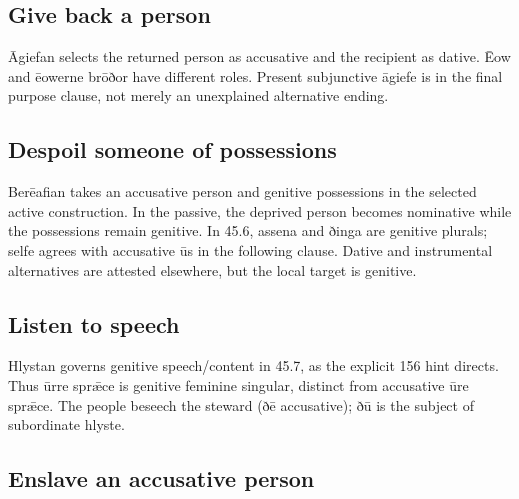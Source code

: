 \subsection*{Give back a person}

Āgiefan selects the returned person as accusative and the recipient as dative. Ēow and ēowerne brōðor have different roles. Present subjunctive āgiefe is in the final purpose clause, not merely an unexplained alternative ending.

\subsection*{Despoil someone of possessions}

Berēafian takes an accusative person and genitive possessions in the selected active construction. In the passive, the deprived person becomes nominative while the possessions remain genitive. In 45.6, assena and ðinga are genitive plurals; selfe agrees with accusative ūs in the following clause. Dative and instrumental alternatives are attested elsewhere, but the local target is genitive.

\subsection*{Listen to speech}

Hlystan governs genitive speech/\allowbreak{}content in 45.7, as the explicit 156 hint directs. Thus ūrre sprǣce is genitive feminine singular, distinct from accusative ūre sprǣce. The people beseech the steward (ðē accusative); ðū is the subject of subordinate hlyste.

\subsection*{Enslave an accusative person}


